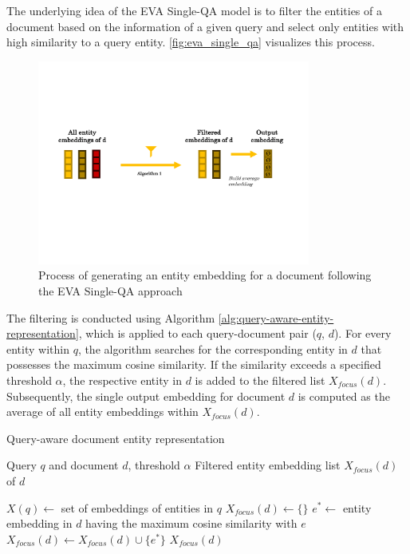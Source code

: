 The underlying idea of the EVA Single-QA model is to filter the entities of a document based on the information of a given query and select only entities with high similarity to a query entity. \autoref{fig:eva_single_qa} visualizes this process.

\begin{figure}[!htb]
    \centering
    \includegraphics[trim={1cm 6.5cm 2cm 6cm}, clip, width=0.8\textwidth]{resources/eva_single_qa} 
    \caption{Process of generating an entity embedding for a document following the EVA Single-QA approach}
    \label{fig:eva_single_qa}
\end{figure}

The filtering is conducted using Algorithm \ref{alg:query-aware-entity-representation}, which is applied to each query-document pair ($q$, $d$). For every entity within $q$, the algorithm searches for the corresponding entity in $d$ that possesses the maximum cosine similarity. If the similarity exceeds a specified threshold $\alpha$, the respective entity in $d$ is added to the filtered list $X_{focus}(d)$. Subsequently, the single output embedding for document $d$ is computed as the average of all entity embeddings within $X_{focus}(d)$.

\begin{algorithm}[!htb]
    \footnotesize
    \caption{Query-aware document entity representation}
    \label{alg:query-aware-entity-representation}
    \begin{algorithmic}[1]
    \REQUIRE Query $q$ and document $d$, threshold $\alpha$
    \ENSURE Filtered entity embedding list $X_{focus}(d)$ of $d$
    
    \STATE $X(q) \leftarrow$ set of embeddings of entities in $q$
    \STATE $X_{focus}(d) \leftarrow \{\}$
        \STATE $e^* \leftarrow$ entity embedding in $d$ having the maximum cosine similarity with $e$
            \STATE $X_{focus}(d) \leftarrow X_{focus}(d) \cup \{e^*\}$
        \ENDIF
    \ENDFOR
    \RETURN $X_{focus}(d)$
    \end{algorithmic}
\end{algorithm}

